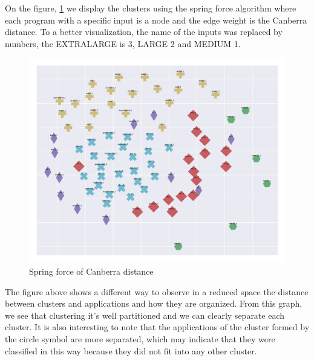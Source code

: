 On the figure, \ref{fig:sping_force_is} we display the clusters using the spring force algorithm where each program with a specific input is a node and the edge weight is the Canberra distance. To a better visualization, the name of the inputs was replaced by numbers, the EXTRALARGE is 3, LARGE 2 and MEDIUM 1. 

\begin{figure}[H]
    \centering
    \includegraphics[width=\textwidth]{fingerprint/figures/graph_input_size.png}
    \caption{Spring force of Canberra distance}
    \label{fig:sping_force_is}
\end{figure}

The figure above shows a different way to observe in a reduced space the distance between clusters and applications and how they are organized. From this graph, we see that clustering it's well partitioned and we can clearly separate each cluster. It is also interesting to note that the applications of the cluster formed by the circle symbol are more separated, which may indicate that they were classified in this way because they did not fit into any other cluster.


